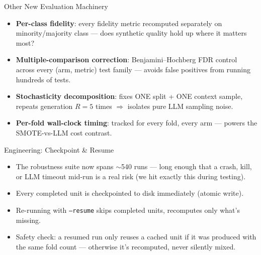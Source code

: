 \documentclass[aspectratio=169, 11pt]{beamer}
\begin{document}
\begin{frame}{Other New Evaluation Machinery}
\begin{itemize}
\item \textbf{Per-class fidelity}: every fidelity metric recomputed separately on minority/majority class --- does synthetic quality hold up where it matters most?
\item \textbf{Multiple-comparison correction}: Benjamini--Hochberg FDR control across every (arm, metric) test family --- avoids false positives from running hundreds of tests.
\item \textbf{Stochasticity decomposition}: fixes ONE split + ONE context sample, repeats generation $R{=}5$ times $\Rightarrow$ isolates pure LLM sampling noise.
\item \textbf{Per-fold wall-clock timing}: tracked for every fold, every arm --- powers the SMOTE-vs-LLM cost contrast.
\end{itemize}
\end{frame}

\begin{frame}{Engineering: Checkpoint \& Resume}
\begin{itemize}
\item The robustness suite now spans $\sim$540 runs --- long enough that a crash, kill, or LLM timeout mid-run is a real risk (we hit exactly this during testing).
\item Every completed unit is checkpointed to disk immediately (atomic write).
\item Re-running with \texttt{--resume} skips completed units, recomputes only what's missing.
\item Safety check: a resumed run only reuses a cached unit if it was produced with the \alert{same fold count} --- otherwise it's recomputed, never silently mixed.
\end{itemize}
\end{frame}
\end{document}
